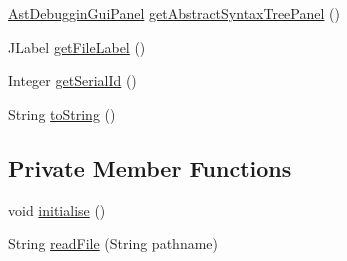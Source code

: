 \begin{DoxyCompactItemize}
\item 
\hyperlink{classit_1_1emarolab_1_1cagg_1_1debugging_1_1baseComponents_1_1customPanel_1_1AstDebugginGuiPanel}{Ast\-Debuggin\-Gui\-Panel} \hyperlink{classit_1_1emarolab_1_1cagg_1_1debugging_1_1DebuggingGui_1_1DebuggingActioner_aba343840f2efc3fdf5a6206345828221}{get\-Abstract\-Syntax\-Tree\-Panel} ()
\item 
J\-Label \hyperlink{classit_1_1emarolab_1_1cagg_1_1debugging_1_1DebuggingGui_1_1DebuggingActioner_ab7bb02f687bcce61b2161214610a69d0}{get\-File\-Label} ()
\item 
Integer \hyperlink{classit_1_1emarolab_1_1cagg_1_1debugging_1_1DebuggingGui_1_1DebuggingActioner_a2462816027b4933d56b76084214c9f81}{get\-Serial\-Id} ()
\item 
String \hyperlink{classit_1_1emarolab_1_1cagg_1_1debugging_1_1DebuggingGui_1_1DebuggingActioner_a3cd7628b120d8a9b4e12defe8acca0df}{to\-String} ()
\end{DoxyCompactItemize}
\subsection*{Private Member Functions}
\begin{DoxyCompactItemize}
\item 
void \hyperlink{classit_1_1emarolab_1_1cagg_1_1debugging_1_1DebuggingGui_1_1DebuggingActioner_a2b41bb8fbb9f4705bc248f52cf77e8b6}{initialise} ()
\item 
String \hyperlink{classit_1_1emarolab_1_1cagg_1_1debugging_1_1DebuggingGui_1_1DebuggingActioner_ae9b150a2c0617d656ba012cacb490700}{read\-File} (String pathname)
\end{DoxyCompactItemize}
